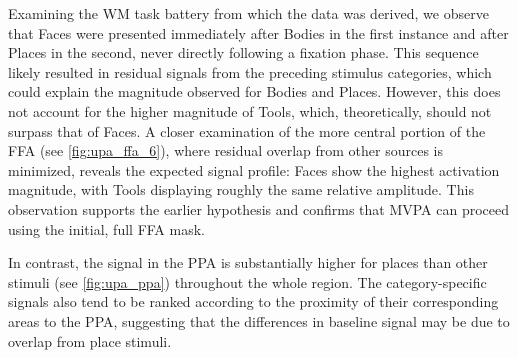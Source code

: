 Examining the \gls{WM} task battery from which the data was derived, we observe that Faces were presented immediately after Bodies in the first instance and after Places in the second, never directly following a fixation phase. This sequence likely resulted in residual signals from the preceding stimulus categories, which could explain the magnitude observed for Bodies and Places. However, this does not account for the higher magnitude of Tools, which, theoretically, should not surpass that of Faces. A closer examination of the more central portion of the \gls{FFA} (see \autoref{fig:upa_ffa_6}), where residual overlap from other sources is minimized, reveals the expected signal profile: Faces show the highest activation magnitude, with Tools displaying roughly the same relative amplitude. This observation supports the earlier hypothesis and confirms that \gls{MVPA} can proceed using the initial, full \gls{FFA} mask.

In contrast, the signal in the \gls{PPA} is substantially higher for places than other stimuli (see \autoref{fig:upa_ppa}) throughout the whole region. The category-specific signals also tend to be ranked according to the proximity of their corresponding areas to the \gls{PPA}, suggesting that the differences in baseline signal may be due to overlap from place stimuli.

